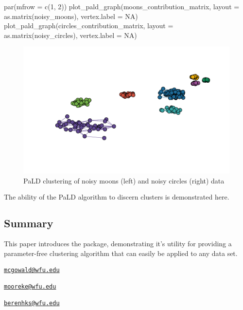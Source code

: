 \begin{Schunk}
\begin{Sinput}
par(mfrow = c(1, 2))
plot_pald_graph(moons_contribution_matrix,
                layout = as.matrix(noisy_moons),
                vertex.label = NA)
plot_pald_graph(circles_contribution_matrix,
                layout = as.matrix(noisy_circles),
                vertex.label = NA)
\end{Sinput}
\begin{figure}
\includegraphics{manuscript_files/figure-latex/fig6-1} \caption[PaLD clustering of noisy moons (left) and noisy circles (right) data]{PaLD clustering of noisy moons (left) and noisy circles (right) data}\label{fig:fig6}
\end{figure}
\end{Schunk}

The ability of the PaLD algorithm to discern clusters is demonstrated
here.

\hypertarget{summary}{%
\subsection{Summary}\label{summary}}

This paper introduces the  package, demonstrating it's
utility for providing a parameter-free clustering algorithm that can
easily be applied to any data set.




\address{%
Lucy D'Agostino McGowan\\
Wake Forest University\\
Winston-Salem, NC\\ 27106\\
}
\href{mailto:mcgowald@wfu.edu}{\nolinkurl{mcgowald@wfu.edu}}

\address{%
Katherine Moore\\
Wake Forest Unversity\\
Winston-Salem, NC\\ 27106\\
}
\href{mailto:mooreke@wfu.edu}{\nolinkurl{mooreke@wfu.edu}}

\address{%
Kenneth Berenhaut\\
Wake Forest University\\
Winston-Salem, NC\\ 27106\\
}
\href{mailto:berenhks@wfu.edu}{\nolinkurl{berenhks@wfu.edu}}

